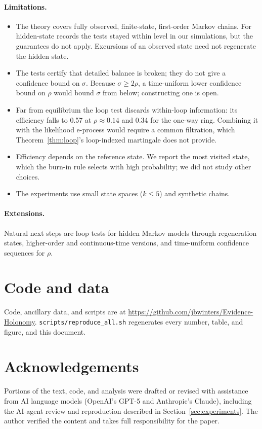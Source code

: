 \documentclass[11pt]{article}
\theoremstyle{definition}
\theoremstyle{remark}
\begin{document}
\paragraph{Limitations.}
\begin{itemize}[leftmargin=1.25em,itemsep=0.1em]
\item The theory covers fully observed, finite-state, first-order Markov chains. For hidden-state records the tests stayed within level in our simulations, but the guarantees do not apply. Excursions of an observed state need not regenerate the hidden state.
\item The tests certify that detailed balance is broken; they do not give a confidence bound on $\sigma$. Because $\sigma\ge2\rho$, a time-uniform lower confidence bound on $\rho$ would bound $\sigma$ from below; constructing one is open.
\item Far from equilibrium the loop test discards within-loop information: its efficiency falls to 0.57 at $\rho\approx0.14$ and 0.34 for the one-way ring. Combining it with the likelihood e-process would require a common filtration, which Theorem~\ref{thm:loop}'s loop-indexed martingale does not provide.
\item Efficiency depends on the reference state. We report the most visited state, which the burn-in rule selects with high probability; we did not study other choices.
\item The experiments use small state spaces ($k\le5$) and synthetic chains.
\end{itemize}

\paragraph{Extensions.} Natural next steps are loop tests for hidden Markov models through regeneration states, higher-order and continuous-time versions, and time-uniform confidence sequences for $\rho$.

\section*{Code and data}
Code, ancillary data, and scripts are at \url{https://github.com/jbwinters/Evidence-Holonomy}. \texttt{scripts/reproduce\_all.sh} regenerates every number, table, and figure, and this document.

\section*{Acknowledgements}
Portions of the text, code, and analysis were drafted or revised with assistance from AI language models (OpenAI's GPT-5 and Anthropic's Claude), including the AI-agent review and reproduction described in Section~\ref{sec:experiments}. The author verified the content and takes full responsibility for the paper.
\end{document}

